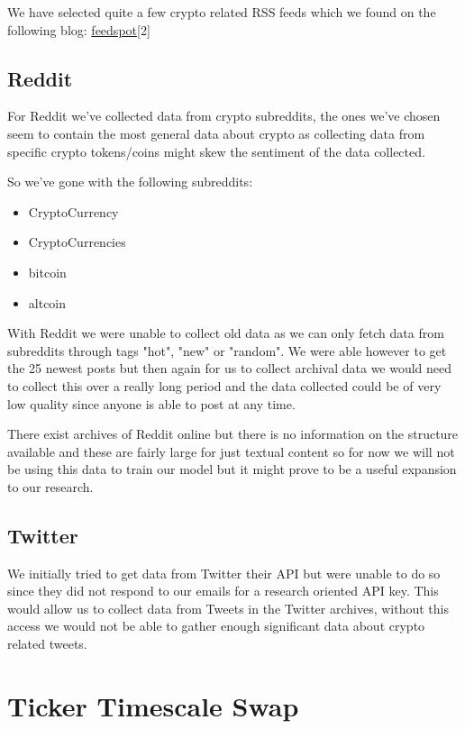 \documentclass[12pt,a4paper]{article}
\begin{document}
We have selected quite a few crypto related RSS feeds which we found on the following blog: \href{https://blog.feedspot.com/cryptocurrency_rss_feeds/}{feedspot}[2]

\subsection{Reddit}

For Reddit we've collected data from crypto subreddits, the ones we've chosen seem to contain the most general data about crypto as collecting data from specific crypto tokens/coins might skew the sentiment of the data collected.

So we've gone with the following subreddits:
\begin{itemize}
\item CryptoCurrency
\item CryptoCurrencies
\item bitcoin
\item altcoin
\end{itemize}
With Reddit we were unable to collect old data as we can only fetch data from subreddits through tags "hot", "new" or "random". We were able however to get the 25 newest posts but then again for us to collect archival data we would need to collect this over a really long period and the data collected could be of very low quality since anyone is able to post at any time.

There exist archives of Reddit online but there is no information on the structure available and these are fairly large for just textual content so for now we will not be using this data to train our model but it might prove to be a useful expansion to our research.

\subsection{Twitter}

We initially tried to get data from Twitter their API but were unable to do so since they did not respond to our emails for a research oriented API key. 
This would allow us to collect data from Tweets in the Twitter archives, without this access we would not be able to gather enough significant data about crypto related tweets.

\section{Ticker Timescale Swap}
\end{document}
